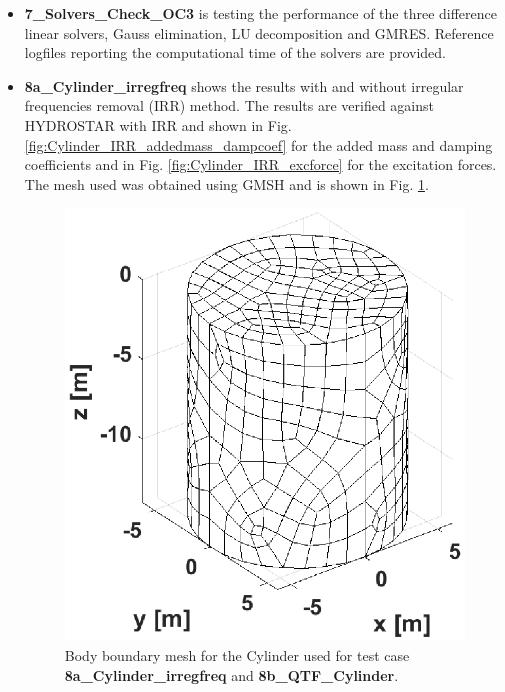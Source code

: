 \documentclass[12pt,a4paper,titlepage]{article}
\begin{document}
\begin{itemize}
\item \textbf{7\_Solvers\_Check\_OC3} is testing the performance of the three difference linear solvers, Gauss elimination, LU decomposition and GMRES. Reference logfiles reporting the computational time of the solvers are provided.

\item \textbf{8a\_Cylinder\_irregfreq} shows the results with and without irregular frequencies removal (IRR) method. The results are verified against HYDROSTAR with IRR and shown in Fig. \ref{fig:Cylinder_IRR_addedmass_dampcoef} for the added mass and damping coefficients and in Fig. \ref{fig:Cylinder_IRR_excforce} for the excitation forces. The mesh used was obtained using GMSH \cite{gmsh} and is shown in Fig. \ref{fig:meshesCylinder}.

\begin{figure}[h!tbp]
\centering
\includegraphics[scale=0.5,trim = 0mm 0mm 0mm 0mm, clip]{figures/Cylinder/mesh.eps}	
\caption{Body boundary mesh for the Cylinder used for test case \textbf{8a\_Cylinder\_irregfreq} and \textbf{8b\_QTF\_Cylinder}.}\label{fig:meshesCylinder}
\end{figure}


\end{itemize}
\end{document}
